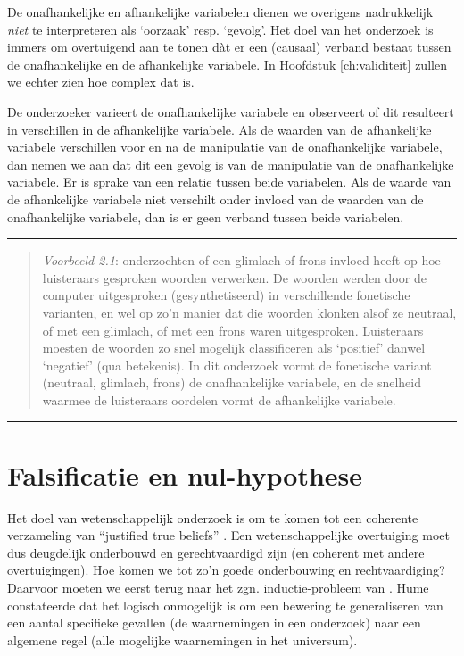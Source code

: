 \documentclass[
]{book}
\begin{document}
De onafhankelijke en afhankelijke variabelen dienen we overigens
nadrukkelijk \emph{niet} te interpreteren als `oorzaak' resp. `gevolg'. Het
doel van het onderzoek is immers om overtuigend aan te tonen dàt er een
(causaal) verband bestaat tussen de onafhankelijke en de afhankelijke
variabele. In
Hoofdstuk \ref{ch:validiteit} zullen we echter zien hoe complex dat is.

De onderzoeker varieert de onafhankelijke variabele en observeert of dit
resulteert in verschillen in de afhankelijke variabele. Als de waarden
van de afhankelijke variabele verschillen voor en na de manipulatie van
de onafhankelijke variabele, dan nemen we aan dat dit een gevolg is van
de manipulatie van de onafhankelijke variabele. Er is sprake van een
relatie tussen beide variabelen. Als de waarde van de afhankelijke
variabele niet verschilt onder invloed van de waarden van de
onafhankelijke variabele, dan is er geen verband tussen beide
variabelen.

\begin{center}\rule{0.5\linewidth}{0.5pt}\end{center}

\begin{quote}
\emph{Voorbeeld 2.1}: \citep{QSF12} onderzochten of een
glimlach of frons invloed heeft op hoe luisteraars gesproken woorden
verwerken. De woorden werden door de computer uitgesproken
(gesynthetiseerd) in verschillende fonetische varianten, en wel op zo'n manier dat die woorden klonken alsof ze neutraal, of met een glimlach,
of met een frons waren uitgesproken. Luisteraars moesten de woorden zo
snel mogelijk classificeren als `positief' danwel `negatief' (qua
betekenis). In dit onderzoek vormt de fonetische variant (neutraal,
glimlach, frons) de onafhankelijke variabele, en de snelheid waarmee de
luisteraars oordelen vormt de afhankelijke variabele.
\end{quote}

\begin{center}\rule{0.5\linewidth}{0.5pt}\end{center}

\hypertarget{sec:falsificatie}{%
\section{Falsificatie en nul-hypothese}\label{sec:falsificatie}}

Het doel van wetenschappelijk onderzoek is om te komen tot een coherente
verzameling van ``justified true beliefs'' \citep{Mort03}. Een
wetenschappelijke overtuiging moet dus deugdelijk onderbouwd en
gerechtvaardigd zijn (en coherent met andere overtuigingen). Hoe komen
we tot zo'n goede onderbouwing en rechtvaardiging? Daarvoor moeten we
eerst terug naar het zgn. inductie-probleem van \citep{Hume1739}. Hume constateerde dat
het logisch onmogelijk is om een bewering te generaliseren van een
aantal specifieke gevallen (de waarnemingen in een onderzoek) naar een
algemene regel (alle mogelijke waarnemingen in het universum).
\end{document}
